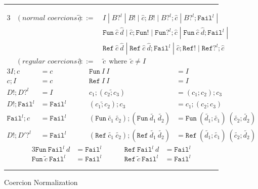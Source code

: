 \begin{figure}[ht]
    \caption{Coercion Normalization}
    \hrule
    \vspace{4mm}
    \qquad {}
    \begin{alignat*}{3}
        &(\textit{normal coercions}) \qquad 
        & \tilde{c} ::= \: & I \; | \;  
              B?^l \; | \;
              B! \; | \; 
              \hat{c};B! \; | \; 
              B?^l;\hat{c} \; | \; 
              B?^l; \texttt{Fail}^l \; | \; \\
        &&    & \texttt{Fun} \: \hat{c} \: \hat{d} \; | \;
              \hat{c};\texttt{Fun}! \; | \; 
              \texttt{Fun}?^l;\hat{c} \; | \; 
              \texttt{Fun} \: \hat{c} \: \hat{d}; \texttt{Fail}^l \; | \; \\
        &&    & \texttt{Ref} \: \hat{c} \: \hat{d} \; | \; 
              \texttt{Ref} \: \hat{c} \: \hat{d}; \texttt{Fail}^l \; | \;
              \hat{c};\texttt{Ref}! \; | \;
              \texttt{Ref}?^l;\hat{c} \\
        &(\textit{regular coercions}) \qquad
        & \hat{c} ::= \: & \tilde{c} \: \: \text{where} \: \: \tilde{c} \neq I
    \end{alignat*}
    \qquad {}
    \begin{alignat*}{3} 
        I;c & = c \hspace{1cm} & \texttt{Fun} \: I \: I & = I \\
        c;I & = c \hspace{1cm} & \texttt{Ref} \: I \: I & = I \\
        D!;D?^l & = I \hspace{1cm} & c_1;(\tilde{c_2;c_3}) & = (c_1;c_2);c_3 \\
        D!;\texttt{Fail}^l & = \texttt{Fail}^l \hspace{1cm} & (\tilde{c_1;c_2});c_3 & = c_1;(c_2;c_3) \\
        \texttt{Fail}^l;c & = \texttt{Fail}^l \hspace{1cm} & (\texttt{Fun} \: \tilde{c_1} \: \tilde{c_2});(\texttt{Fun} \: \tilde{d_1} \: \tilde{d_2}) & = 
        \texttt{Fun} \: (\tilde{d_1};\tilde{c_1}) \: (\tilde{c_2};\tilde{d_2}) \\
        D!;D'?^l & = \texttt{Fail}^l \hspace{1cm} & (\texttt{Ref} \: \tilde{c_1} \: \tilde{c_2});(\texttt{Ref} \: \tilde{d_1} \: \tilde{d_2}) & = 
        \texttt{Ref} \: (\tilde{d_1};\tilde{c_1}) \: (\tilde{c_2};\tilde{d_2})
    \end{alignat*}
    \qquad {}
    \begin{alignat*}{3} 
        \texttt{Fun} \: \texttt{Fail}^l \: d & = \texttt{Fail}^l \hspace{1cm} & 
        \texttt{Ref} \: \texttt{Fail}^l \: d & = \texttt{Fail}^l \\
        \texttt{Fun} \: \tilde{c} \: \texttt{Fail}^l & = \texttt{Fail}^l \hspace{1cm} & 
        \texttt{Ref} \: \tilde{c} \: \texttt{Fail}^l & = \texttt{Fail}^l 
    \end{alignat*}
    \hrule
\end{figure} 